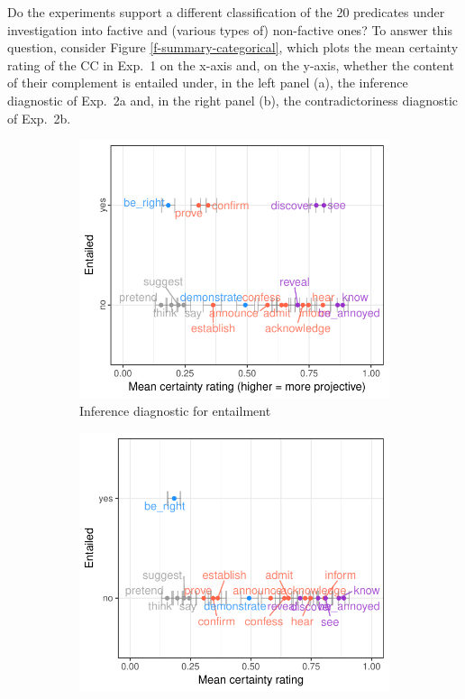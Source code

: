 \documentclass[11pt,fleqn]{article}
\newcommand{\6}{\mbox{$[\hspace*{-.6mm}[$}}
\newcommand{\9}{\mbox{$]\hspace*{-.6mm}]$}}
\begin{document}
{\begin{itemize}
Do the experiments support a different classification of the 20 predicates under investigation into factive and (various types of) non-factive ones? To answer this question, consider Figure \ref{f-summary-categorical}, which plots the mean certainty rating of the CC in Exp.~1 on the x-axis and, on the y-axis, whether the content of their complement is entailed under, in the left panel (a), the inference diagnostic of Exp.~2a and, in the right panel (b), the contradictoriness diagnostic of Exp.~2b. 

\begin{figure}[h]

\begin{subfigure}{.5\textwidth}
\centering
\includegraphics[width=.35\paperwidth]{../results/5-projectivity-no-fact/graphs/projection-by-inferenceEntailment}
\caption{Inference diagnostic for entailment}
\end{subfigure}%
\begin{subfigure}{.5\textwidth}
\centering
\includegraphics[width=.35\paperwidth]{../results/5-projectivity-no-fact/graphs/projection-by-contradictorinessEntailment}

\end{subfigure}
\end{figure}
\end{itemize}}
\end{document}
